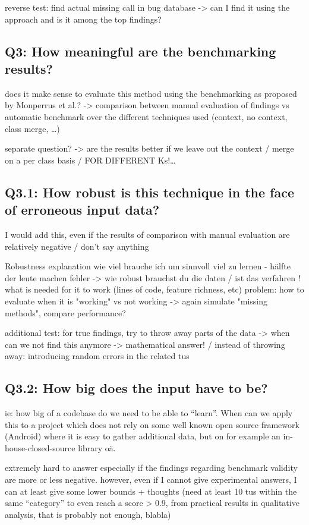reverse test: find actual missing call in bug database -> can I find it using the approach and is it among the top findings?

\subsection{Q3: How meaningful are the benchmarking results?}
does it make sense to evaluate this method using the benchmarking as proposed by Monperrus et al.?
-> comparison between manual evaluation of findings vs automatic benchmark over the different techniques used (context, no context, class merge, \ldots)

separate question? -> are the results better if we leave out the context / merge on a per class basis / FOR DIFFERENT Ks!\ldots

\subsection{Q3.1: How robust is this technique in the face of erroneous input data?}
I would add this, even if the results of comparison with manual evaluation are relatively negative / don't say anything

Robustness explanation
    wie viel brauche ich um sinnvoll viel zu lernen - hälfte der leute machen fehler -> wie robust brauchst du die daten / ist das verfahren !
    what is needed for it to work (lines of code, feature richness, etc) 
    problem: how to evaluate when it is "working" vs not working -> again simulate "missing methods", compare performance?

additional test:
	for true findings, try to throw away parts of the data -> when can we not find this anymore -> mathematical answer!
    / instead of throwing away: introducing random errors in the related tus

\subsection{Q3.2: How big does the input have to be?}
ie: how big of a codebase do we need to be able to ``learn''. When can we apply this to a project which does not rely on some well known open source framework (Android) where it is easy to gather additional data, but on for example an in-house-closed-source library oä.

extremely hard to answer especially if the findings regarding benchmark validity are more or less negative.
however, even if I cannot give experimental answers, I can at least give some lower bounds + thoughts
(need at least 10 tus within the same ``category'' to even reach a score > 0.9, from practical results in qualitative analysis, that is probably not enough, blabla)

